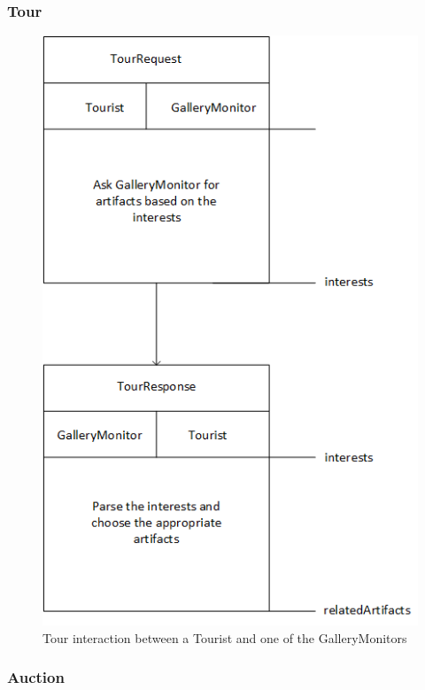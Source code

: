 \documentclass[a4paper, 11pt]{article}
\begin{document}
\subsubsection{Tour}

\begin{figure}[H]
	\caption{Tour interaction between a Tourist and one of the GalleryMonitors}
	\centering
	\includegraphics[scale=0.8]{./images/interaction-tourguide.png}
\end{figure}

\subsubsection{Auction}
\end{document}
